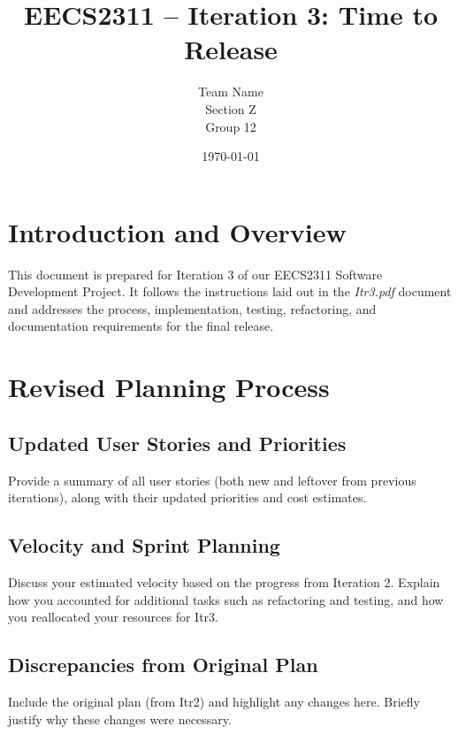 \documentclass[12pt]{article}
\title{EECS2311 -- Iteration 3: Time to Release}
\author{Team Name \\ Section Z \\ Group 12}
\date{\today}
\begin{document}
\maketitle

\tableofcontents
\newpage

\section{Introduction and Overview}

This document is prepared for Iteration 3 of our EECS2311 Software Development Project.
It follows the instructions laid out in the \emph{Itr3.pdf} document and addresses the
process, implementation, testing, refactoring, and documentation requirements for the final release.

\section{Revised Planning Process}

\subsection{Updated User Stories and Priorities}
Provide a summary of all user stories (both new and leftover from previous iterations),
along with their updated priorities and cost estimates.

\subsection{Velocity and Sprint Planning}
Discuss your estimated velocity based on the progress from Iteration 2.
Explain how you accounted for additional tasks such as refactoring and testing,
and how you reallocated your resources for Itr3.

\subsection{Discrepancies from Original Plan}
Include the original plan (from Itr2) and highlight any changes here.
Briefly justify why these changes were necessary.
\end{document}
